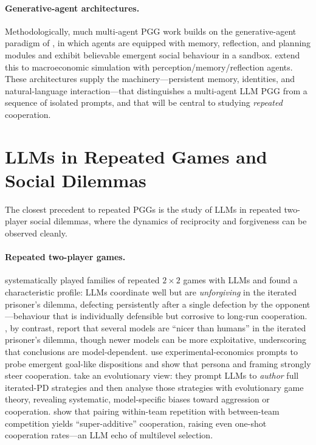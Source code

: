 \documentclass[11pt,a4paper]{article}
\begin{document}
\paragraph{Generative-agent architectures.}
Methodologically, much multi-agent PGG work builds on the generative-agent
paradigm of \citet{park2023generative}, in which agents are equipped with memory,
reflection, and planning modules and exhibit believable emergent social behaviour
in a sandbox. \citet{li2024econagent} extend this to macroeconomic simulation
with perception/memory/reflection agents. These architectures supply the
machinery---persistent memory, identities, and natural-language interaction---that
distinguishes a multi-agent LLM PGG from a sequence of isolated prompts, and that
will be central to studying \emph{repeated} cooperation.

\section{LLMs in Repeated Games and Social Dilemmas}
\label{sec:repeated}

The closest precedent to repeated PGGs is the study of LLMs in repeated
two-player social dilemmas, where the dynamics of reciprocity and forgiveness can
be observed cleanly.

\paragraph{Repeated two-player games.}
\citet{akata2025playing} systematically played families of repeated $2\times2$
games with LLMs and found a characteristic profile: LLMs coordinate well but are
\emph{unforgiving} in the iterated prisoner's dilemma, defecting persistently
after a single defection by the opponent---behaviour that is individually
defensible but corrosive to long-run cooperation. \citet{fontana2025nicer}, by
contrast, report that several models are ``nicer than humans'' in the iterated
prisoner's dilemma, though newer models can be more exploitative, underscoring
that conclusions are model-dependent. \citet{phelps2023investigating} use
experimental-economics prompts to probe emergent goal-like dispositions and show
that persona and framing strongly steer cooperation. \citet{willis2025cooperate}
take an evolutionary view: they prompt LLMs to \emph{author} full iterated-PD
strategies and then analyse those strategies with evolutionary game theory,
revealing systematic, model-specific biases toward aggression or cooperation.
\citet{tonini2025superadditive} show that pairing within-team repetition with
between-team competition yields ``super-additive'' cooperation, raising even
one-shot cooperation rates---an LLM echo of multilevel selection.
\end{document}
